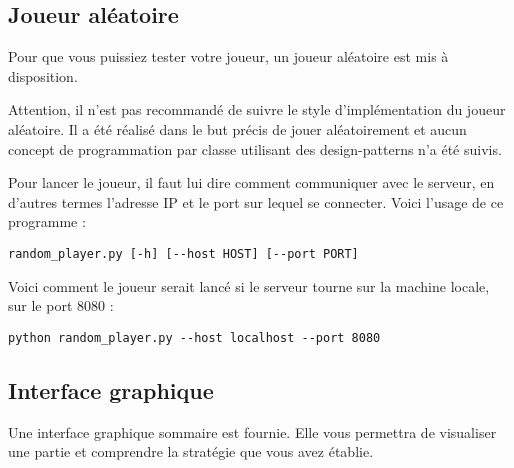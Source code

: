 
\subsection{Joueur aléatoire} %
Pour que vous puissiez tester votre joueur, un joueur aléatoire est mis à disposition.

\begin{warning}
Attention, il n'est pas recommandé de suivre le style d'implémentation du joueur aléatoire.
Il a été réalisé dans le but précis de jouer aléatoirement et aucun concept de programmation par classe utilisant des
design-patterns n'a été suivis.
\end{warning}

Pour lancer le joueur, il faut lui dire comment communiquer avec le serveur, en d'autres termes l'adresse IP et le port sur
lequel se connecter. Voici l'usage de ce programme :

\begin{lstlisting}
random_player.py [-h] [--host HOST] [--port PORT] 
\end{lstlisting}

Voici comment le joueur serait lancé si le serveur tourne sur la machine locale, sur le port 8080 :

\begin{lstlisting}
python random_player.py --host localhost --port 8080 
\end{lstlisting}

\subsection{Interface graphique} %

Une interface graphique sommaire est fournie.
Elle vous permettra de visualiser une partie et comprendre la stratégie que vous avez établie.


